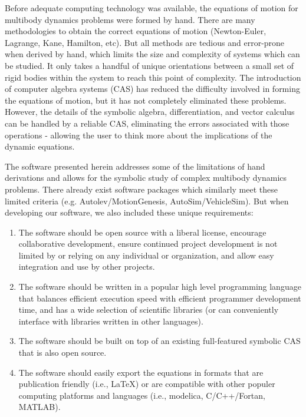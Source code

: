 \documentclass[twocolumn,10pt]{asme2e}
\begin{document}
Before adequate computing technology was available, the equations of motion for
multibody dynamics problems were formed by hand. There are many methodologies
to obtain the correct equations of motion (Newton-Euler, Lagrange, Kane,
Hamilton, etc). But all methods are tedious and error-prone when derived by
hand, which limits the size and complexity of systems which can be studied. It
only takes a handful of unique orientations between a small set of rigid bodies
within the system to reach this point of complexity. The introduction of
computer algebra systems (CAS) has reduced the difficulty involved in forming
the equations of motion, but it has not completely eliminated these problems.
However, the details of the symbolic algebra, differentiation, and vector
calculus can be handled by a reliable CAS, eliminating the errors associated
with those operations - allowing the user to think more about the implications
of the dynamic equations.

The software presented herein addresses some of the limitations of hand
derivations and allows for the symbolic study of complex multibody dynamics
problems. There already exist software packages which similarly meet these
limited criteria (e.g. Autolev/MotionGenesis, AutoSim/VehicleSim). But when
developing our software, we also included these unique requirements:
\begin{enumerate}
  \item The software should be open source with a liberal license, encourage
  collaborative development, ensure continued project development is not
  limited by or relying on any individual or organization, and allow easy
  integration and use by other projects.

  \item The software should be written in a popular high level programming
  language that balances efficient execution speed with efficient programmer
  development time, and has a wide selection of scientific libraries (or can
  conveniently interface with libraries written in other languages).

  \item The software should be built on top of an existing full-featured
  symbolic CAS that is also open source.

  \item The software should easily export the equations in formats that are
  publication friendly (i.e., \LaTeX) or are compatible with other populer
  computing platforms and languages (i.e., modelica, C/C++/Fortan, MATLAB).
\end{enumerate}
\end{document}
